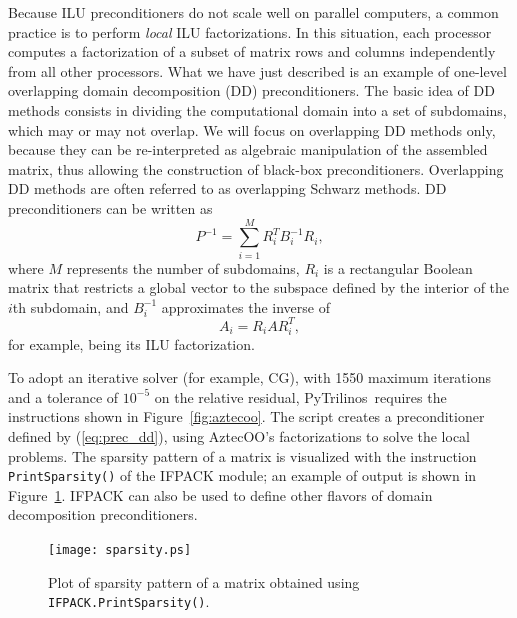 \documentclass[acmtocl]{acmtrans2m}
\newcommand{\PyTrilinos}{{PyTrilinos}}
\begin{document}
Because ILU preconditioners do not scale well on parallel computers, a
common practice is to perform {\em local} ILU factorizations.  In this
situation, each processor computes a factorization of a subset of
matrix rows and columns independently from all other processors.
What we have just described is an example of one-level overlapping
domain decomposition (DD) preconditioners.  The basic idea of DD
methods consists in dividing the computational domain into a set of
subdomains, which may or may not overlap. We will focus on overlapping
DD methods only, because they can be re-interpreted as algebraic
manipulation of the assembled matrix, thus allowing the construction
of black-box preconditioners. Overlapping DD methods are often
referred to as overlapping Schwarz methods. DD preconditioners can be
written as
\begin{equation}
  \label{eq:prec_dd}
  P^{-1} = \sum_{i=1}^M R_i^T B_i^{-1} R_i,
\end{equation}
where $M$ represents the number of subdomains, $R_i$ is a rectangular
Boolean matrix that restricts a global vector to the subspace defined
by the interior of the $i$th subdomain, and $B_i^{-1}$ approximates
the inverse of
\begin{equation}
  \label{eq:aztecoo_tilde_a}
  A_i = R_i A R_i^T,
\end{equation}
for example, being its ILU factorization.

\medskip

To adopt an iterative solver (for example, CG), with 1550 maximum
iterations and a tolerance of $10^{-5}$ on the relative residual,
\PyTrilinos\ requires the instructions shown in
Figure~\ref{fig:aztecoo}. The script creates a preconditioner defined by
(\ref{eq:prec_dd}), using AztecOO's factorizations to solve the local
problems. The sparsity pattern of a matrix is visualized with the
instruction \verb!PrintSparsity()! of the IFPACK module; an example of
output is shown in Figure~\ref{fig:sparsity}. IFPACK can also be used
to define other flavors of domain decomposition preconditioners.

\begin{figure}
  \begin{center}
    \texttt{[image: sparsity.ps]}
    \caption{Plot of sparsity pattern of a matrix obtained using
      {\tt IFPACK.PrintSparsity()}.}
    \label{fig:sparsity}
  \end{center}
\end{figure}
\end{document}
